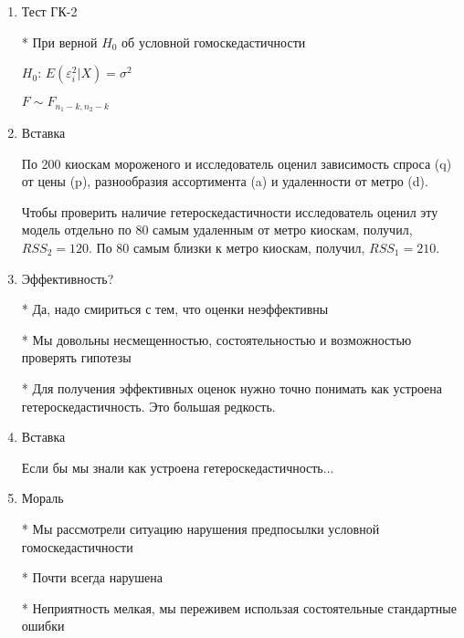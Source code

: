 \documentclass[12pt,a4paper]{article}
\begin{document}
{\begin{enumerate}
* Сортируем наблюдения по предполагаемому убыванию условной дисперсии

* Выкидываем часть наблюдений посередине (20\%)

* оцениваем исходную модель отдельно по первым и по последним наблюдениям

* Считаем $F=\frac{RSS_1/(n_1-k)}{RSS_2/(n_2-k)}$

\newpage
\item Тест ГК-2

* При верной $H_0$ об условной гомоскедастичности

$H_0$: $E(\varepsilon^2_i|X)=\sigma^2$

$F\sim F_{n_1-k,n_2-k}$


\item Вставка

По 200 киоскам мороженого и  исследователь оценил зависимость спроса (q) от цены (p), разнообразия ассортимента (a) и удаленности от метро (d).

Чтобы проверить наличие гетероскедастичности исследователь оценил эту модель отдельно по 80 самым удаленным от метро киоскам, получил, $RSS_2=120$. По 80 самым близки к метро киоскам, получил, $RSS_1=210$. 

\newpage
\item Эффективность?

* Да, надо смириться с тем, что оценки неэффективны

* Мы довольны несмещенностью, состоятельностью и возможностью проверять гипотезы

* Для получения эффективных оценок нужно точно понимать как устроена гетероскедастичность. Это большая редкость.


\item Вставка 

Если бы мы знали как устроена гетероскедастичность...


\item Мораль

* Мы рассмотрели ситуацию нарушения предпосылки условной гомоскедастичности

* Почти всегда нарушена
 
* Неприятность мелкая, мы переживем использая состоятельные стандартные ошибки







 

 




\end{enumerate}





} %
\end{document}
